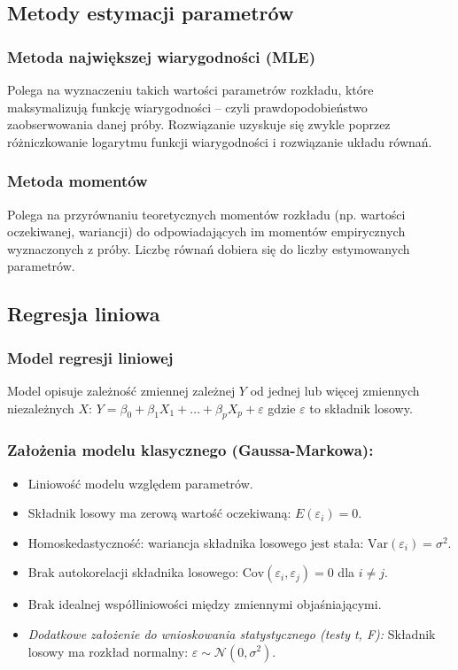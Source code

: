 \subsection{Metody estymacji parametrów}
\subsubsection*{Metoda największej wiarygodności (MLE)}
Polega na wyznaczeniu takich wartości parametrów rozkładu, które maksymalizują funkcję wiarygodności -- czyli prawdopodobieństwo zaobserwowania danej próby. Rozwiązanie uzyskuje się zwykle poprzez różniczkowanie logarytmu funkcji wiarygodności i rozwiązanie układu równań.

\subsubsection*{Metoda momentów}
Polega na przyrównaniu teoretycznych momentów rozkładu (np. wartości oczekiwanej, wariancji) do odpowiadających im momentów empirycznych wyznaczonych z próby. Liczbę równań dobiera się do liczby estymowanych parametrów.

\subsection{Regresja liniowa}
\subsubsection*{Model regresji liniowej}
Model opisuje zależność zmiennej zależnej $Y$ od jednej lub więcej zmiennych niezależnych $X$:
$Y = \beta_0 + \beta_1 X_1 + \ldots + \beta_p X_p + \varepsilon$
gdzie $\varepsilon$ to składnik losowy.

\subsubsection*{Założenia modelu klasycznego (Gaussa-Markowa):}

\begin{itemize}
    \item Liniowość modelu względem parametrów.
    \item Składnik losowy ma zerową wartość oczekiwaną: $E(\varepsilon_i) = 0$.
    \item Homoskedastyczność: wariancja składnika losowego jest stała: $\text{Var}(\varepsilon_i) = \sigma^2$.
    \item Brak autokorelacji składnika losowego: $\text{Cov}(\varepsilon_i, \varepsilon_j) = 0$ dla $i \neq j$.
    \item Brak idealnej współliniowości między zmiennymi objaśniającymi.
    \item \textit{Dodatkowe założenie do wnioskowania statystycznego (testy t, F):} Składnik losowy ma rozkład normalny: $\varepsilon \sim \mathcal{N}(0, \sigma^2)$.
\end{itemize}

